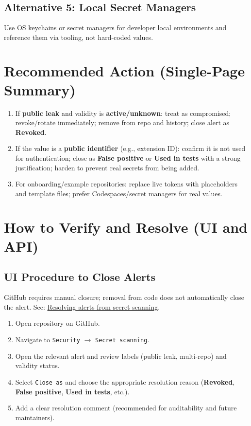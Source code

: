 \documentclass[11pt]{article}
\newcommand{\term}[1]{\textbf{#1}}
\newcommand{\code}[1]{\texttt{#1}}
\begin{document}
\subsection{Alternative 5: Local Secret Managers}
Use OS keychains or secret managers for developer local environments and reference them via tooling, not hard-coded values.

\section{Recommended Action (Single-Page Summary)}
\begin{tcolorbox}[colback=LightGray,colframe=Gray,title=Recommended Action Summary]
\begin{enumerate}
  \item If \textbf{public leak} and validity is \textbf{active/unknown}: treat as compromised; revoke/rotate immediately; remove from repo and history; close alert as \textbf{Revoked}.
  \item If the value is a \textbf{public identifier} (e.g., extension ID): confirm it is not used for authentication; close as \textbf{False positive} or \textbf{Used in tests} with a strong justification; harden to prevent real secrets from being added.
  \item For onboarding/example repositories: replace live tokens with placeholders and template files; prefer Codespaces/secret managers for real values.
\end{enumerate}
\end{tcolorbox}

\section{How to Verify and Resolve (UI and API)}
\subsection{UI Procedure to Close Alerts}
GitHub requires manual closure; removal from code does not automatically close the alert. See: \href{https://docs.github.com/code-security/secret-scanning/managing-alerts-from-secret-scanning/resolving-alerts}{Resolving alerts from secret scanning}.
\begin{enumerate}
  \item Open repository on GitHub.
  \item Navigate to \code{Security} $\rightarrow$ \code{Secret scanning}.
  \item Open the relevant alert and review labels (public leak, multi-repo) and validity status.
  \item Select \code{Close as} and choose the appropriate resolution reason (\term{Revoked}, \term{False positive}, \term{Used in tests}, etc.).
  \item Add a clear resolution comment (recommended for auditability and future maintainers).
\end{enumerate}
\end{document}
